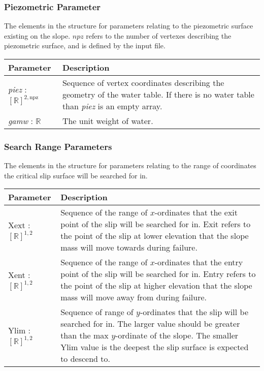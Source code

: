 \documentclass[12pt]{article}
\begin{document}
\subsubsection{Piezometric Parameter} \label{Tbl:PiezParam}
\noindent
The elements in the structure for parameters relating to the
piezometric surface existing on the slope. $npz$ refers to the number
of vertexes describing the piezometric surface, and is defined by the
input file.

\begin{center}
\begin{longtable}{ p{}
    p{}}\hline 
  \textbf{Parameter} & \textbf{Description}\\ \hline

  \textit{piez} : $[\mathbb{R}]^{2,\text{npz}}$ & Sequence of vertex
  coordinates describing the geometry of the water table. If there is
  no water table than \textit{piez} is an empty array. \\

  \textit{gamw} : $\mathbb{R}$ & The unit weight of water. \\ \hline
\end{longtable}
\end{center}

\subsubsection{Search Range Parameters} \label{Tbl:SearchParam}
\noindent
The elements in the structure for parameters relating to the range of
coordinates the critical slip surface will be searched for in.

\begin{center}
\begin{tabular}{ p{}
    p{}}\hline 

  \textbf{Parameter} &
  \textbf{Description}\\ \hline

  Xext : $[\mathbb{R}]^{1,2}$ & Sequence of the range of $x$-ordinates
  that the exit point of the slip will be searched for in. Exit refers
  to the point of the slip at lower elevation that the slope mass will
  move towards during failure. \\

  Xent : $[\mathbb{R}]^{1,2}$ & Sequence of the range of $x$-ordinates
  that the entry point of the slip will be searched for in. Entry
  refers to the point of the slip at higher elevation that the slope
  mass will move away from during failure. \\

  Ylim : $[\mathbb{R}]^{1,2}$ & Sequence of range of $y$-ordinates
  that the slip will be searched for in. The larger value should be
  greater than the max $y$-ordinate of the slope. The smaller Ylim
  value is the deepest the slip surface is expected to descend
  to.\\ \hline
\end{tabular}
\end{center}
\end{document}
